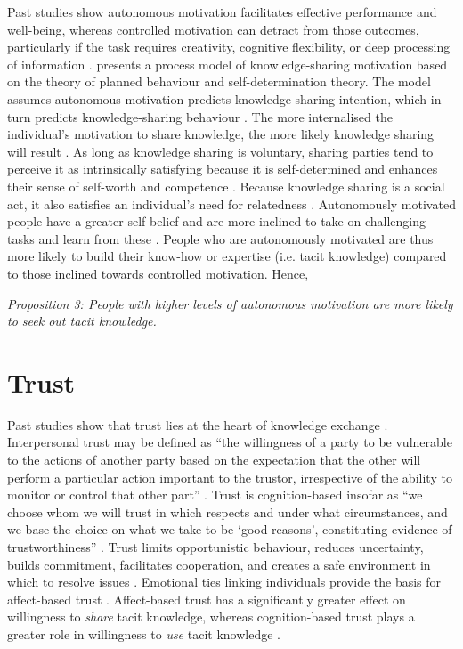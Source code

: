 Past studies show autonomous motivation facilitates effective performance and well-being, whereas controlled motivation can detract from those outcomes, particularly if the task requires creativity, cognitive flexibility, or deep processing of information \citep{gagne2005self}. \citet{gagne2009model} presents a process model of knowledge-sharing motivation based on the theory of planned behaviour and self-determination theory. The model assumes autonomous motivation predicts knowledge sharing intention, which in turn predicts knowledge-sharing behaviour \citep{gagne2009model}. The more internalised the individual’s motivation to share knowledge, the more likely knowledge sharing will result \citep{witherspoon2013antecedents}. As long as knowledge sharing is voluntary, sharing parties tend to perceive it as intrinsically satisfying because it is self-determined and enhances their sense of self-worth and competence \citep{kaser2001knowledge,lam2010knowledge,dumbach2014establishing}. Because knowledge sharing is a social act, it also satisfies an individual's need for relatedness \citep{llopis2016understanding}. Autonomously motivated people have a greater self-belief and are more inclined to take on challenging tasks and learn from these \citep{bandura1977self}. People who are autonomously motivated are thus more likely to build their know-how or expertise (i.e. tacit knowledge) compared to those inclined towards controlled motivation. Hence, \medskip

\emph{Proposition 3: People with higher levels of autonomous motivation are more likely to seek out tacit knowledge.}

\section{Trust}

Past studies show that trust lies at the heart of knowledge exchange \citep[e.g.][]{nonaka1994dynamic,davenport1998working,hsu2007knowledge,wang2016examining}. Interpersonal trust may be defined as \enquote{the willingness of a party to be vulnerable to the actions of another party based on the expectation that the other will perform a particular action important to the trustor, irrespective of the ability to monitor or control that other part} \citep{mayer1995integrative}. Trust is cognition-based insofar as \enquote{we choose whom we will trust in which respects and under what circumstances, and we base the choice on what we take to be \enquote{good reasons}, constituting evidence of trustworthiness} \citep{lewis1985trust}. Trust limits opportunistic behaviour, reduces uncertainty, builds commitment, facilitates cooperation, and creates a safe environment in which to resolve issues \citep{nonaka1994dynamic,panteli2005trust,rasmussen2007work}. Emotional ties linking individuals provide the basis for affect-based trust \citep{mcallister1995affect}. Affect-based trust has a significantly greater effect on willingness to \emph{share} tacit knowledge, whereas cognition-based trust plays a greater role in willingness to \emph{use} tacit knowledge \citep{levin2004strength,holste2010trust}. \medskip

